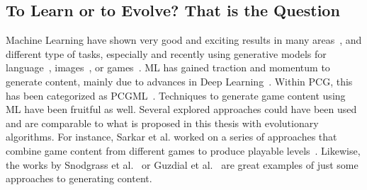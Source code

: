 


\subsection{To Learn or to Evolve? That is the Question}


Machine Learning have shown very good and exciting results in many areas~\cite{canziani_analysis_2016,summerville_procedural_2018}, and different type of tasks, especially and recently using generative models for language~\cite{brown_language_2020}, images~\cite{ramesh_hierarchical_2022,saharia_photorealistic_2022}, or games~\cite{liu_deep_2021}. ML has gained traction and momentum to generate content, mainly due to advances in Deep Learning~\cite{lecun_deep_2015}. Within PCG, this has been categorized as PCGML~\cite{summerville_procedural_2018}. Techniques to generate game content using ML have been fruitful as well. Several explored approaches could have been used and are comparable to what is proposed in this thesis with evolutionary algorithms. For instance, Sarkar et al. worked on a series of approaches that combine game content from different games to produce playable levels~\cite{sarkar_game_2019,sarkar_sequential_2020,sarkar_dungeon_2021}. Likewise, the works by Snodgrass et al.~\cite{snodgrass_levels_2019} or Guzdial et al.~\cite{guzdial_conceptual_2020} are great examples of just some approaches to generating content. 



